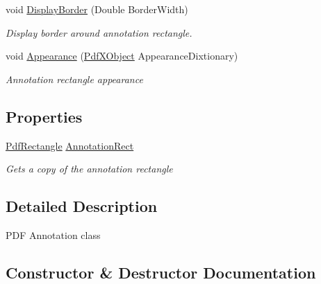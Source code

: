 \begin{DoxyCompactItemize}
void \hyperlink{class_pdf_file_writer_1_1_pdf_annotation_ab41101586285c121d07fc10e9aaf76c2}{Display\+Border} (Double Border\+Width)
\begin{DoxyCompactList}\small\item\em Display border around annotation rectangle. \end{DoxyCompactList}\item 
void \hyperlink{class_pdf_file_writer_1_1_pdf_annotation_aa170cb178462aaa11c0fba232b862268}{Appearance} (\hyperlink{class_pdf_file_writer_1_1_pdf_x_object}{Pdf\+X\+Object} Appearance\+Dixtionary)
\begin{DoxyCompactList}\small\item\em Annotation rectangle appearance \end{DoxyCompactList}\end{DoxyCompactItemize}
\subsection*{Properties}
\begin{DoxyCompactItemize}
\item 
\hyperlink{class_pdf_file_writer_1_1_pdf_rectangle}{Pdf\+Rectangle} \hyperlink{class_pdf_file_writer_1_1_pdf_annotation_ab9f06e18d411b416a5f701372863e387}{Annotation\+Rect}
\begin{DoxyCompactList}\small\item\em Gets a copy of the annotation rectangle \end{DoxyCompactList}\end{DoxyCompactItemize}


\subsection{Detailed Description}
P\+DF Annotation class 



\subsection{Constructor \& Destructor Documentation}

